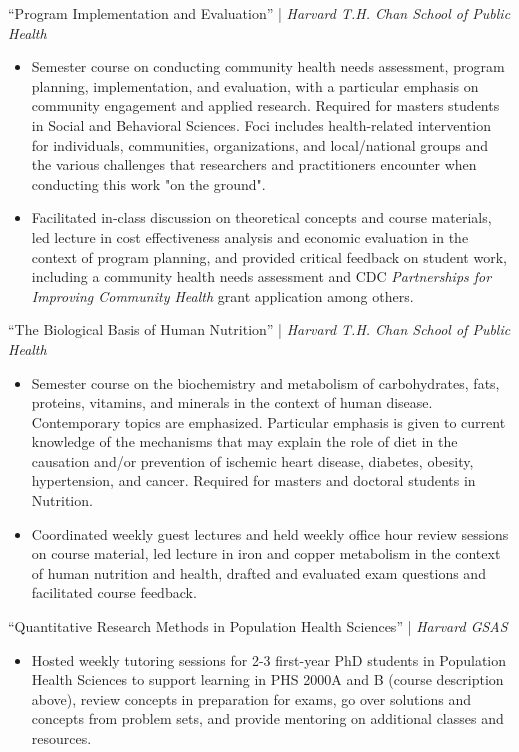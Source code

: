 \documentclass{cv_style}
\begin{document}
``Program Implementation and Evaluation'' | \textit{Harvard T.H. Chan School of Public Health}
\begin{itemize}
  \vspace{0em} \item Semester course on conducting community health needs assessment, program planning, implementation, and evaluation, with a particular emphasis on community engagement and applied research. Required for masters students in Social and Behavioral Sciences. Foci includes health-related intervention for individuals, communities, organizations, and local/national groups and the various challenges that researchers and practitioners encounter when conducting this work "on the ground". 
  \item \parskip 1pt Facilitated in-class discussion on theoretical concepts and course materials, led lecture in cost effectiveness analysis and economic evaluation in the context of program planning, and provided critical feedback on student work, including a community health needs assessment and CDC \textit{Partnerships for Improving Community Health} grant application among others. 
\end{itemize}

``The Biological Basis of Human Nutrition'' | \textit{Harvard T.H. Chan School of Public Health}
\begin{itemize}
  \vspace{0em} \item Semester course on the biochemistry and metabolism of carbohydrates, fats, proteins, vitamins, and minerals in the context of human disease. Contemporary topics are emphasized. Particular emphasis is given to current knowledge of the mechanisms that may explain the role of diet in the causation and/or prevention of ischemic heart disease, diabetes, obesity, hypertension, and cancer. Required for masters and doctoral students in Nutrition.
  \item \parskip 1pt Coordinated weekly guest lectures and held weekly office hour review sessions on course material, led lecture in iron and copper metabolism in the context of human nutrition and health, drafted and evaluated exam questions and facilitated course feedback.
\end{itemize}

``Quantitative Research Methods in Population Health Sciences'' | \textit{Harvard GSAS}
\begin{itemize}
  \vspace{0em} \item Hosted weekly tutoring sessions for 2-3 first-year PhD students in Population Health Sciences to support learning in PHS 2000A and B (course description above), review concepts in preparation for exams, go over solutions and concepts from problem sets, and provide mentoring on additional classes and resources.
\end{itemize}
\end{document}
